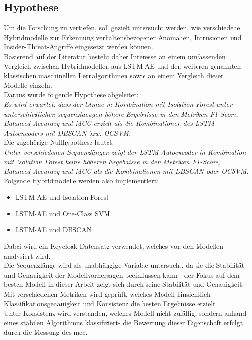 \documentclass[a4paper,12pt]{article}
\begin{document}
	\subsection{Hypothese}
	Um die Forschung zu vertiefen, soll gezielt untersucht werden, wie verschiedene Hybridmodelle zur Erkennung verhaltensbezogener Anomalien, Intrusionen und Insider-Threat-Angriffe eingesetzt werden können.
	\\[0.5em]
	Basierend auf der Literatur besteht daher Interesse an einem umfassenden Vergleich zwischen Hybridmodellen aus LSTM-AE und den weiteren genannten klassischen maschinellen Lernalgorithmen sowie an einem Vergleich dieser Modelle einzeln.
	\\[0.5em]
	Daraus wurde folgende Hypothese abgeleitet:
	\\[0.5em]
	\textit{Es wird erwartet, dass der \gls{lstmae} in Kombination mit Isolation Forest unter unterschiedlichen \gls{sequenzlaenge}n höhere Ergebnisse in den Metriken F1-Score, Balanced Accuracy und MCC erzielt als die Kombinationen des LSTM-Autoencoders mit DBSCAN bzw. OCSVM.}
	\\[0.5em]
	Die zugehörige Nullhypothese lautet:
	\\[0.5em]
	\textit{Unter verschiedenen Sequenzlängen zeigt der LSTM-Autoencoder in Kombination mit Isolation Forest keine höheren Ergebnisse in den Metriken F1-Score, Balanced Accuracy und MCC als die Kombinationen mit DBSCAN oder OCSVM.}
	\\[0.5em]
	Folgende Hybridmodelle werden also implementiert:
	\begin{itemize}
		\item LSTM-AE und Isolation Forest
		\item LSTM-AE und One-Class SVM
		\item LSTM-AE und DBSCAN
	\end{itemize}
	Dabei wird ein Keycloak-Datensatz verwendet, welches von den Modellen analysiert wird. 
	\\[0.5em]
	Die Sequenzlänge wird als unabhängige Variable untersucht, da sie die Stabilität und Genauigkeit der Modellvorhersagen beeinflussen kann - der Fokus auf dem besten Modell in dieser Arbeit zeigt sich durch seine Stabilität und Genauigkeit. Mit verschiedenen Metriken wird geprüft, welches Modell hinsichtlich Klassifikationsgenauigkeit und Konsistenz die besten Ergebnisse erzielt. 
	\\[0.5em]
	Unter Konsistenz wird verstanden, welches Modell nicht zufällig, sondern anhand eines stabilen Algorithmus klassifiziert- die Bewertung dieser Eigenschaft erfolgt durch die Messung des \gls{mcc}.
\end{document}

